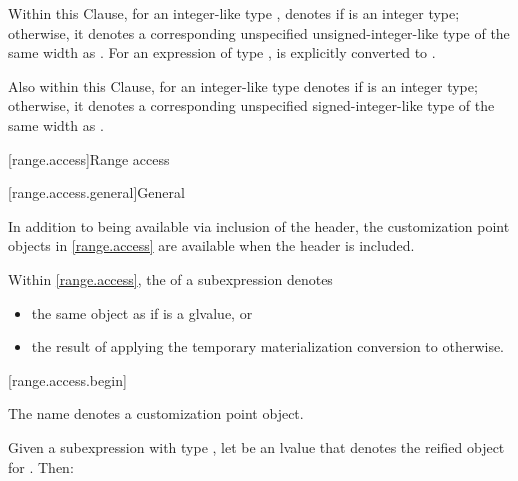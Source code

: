 \pnum
{}%
%
Within this Clause,
for an integer-like type ,
 denotes
 if  is an integer type;
otherwise, it denotes a corresponding unspecified unsigned-integer-like type
of the same width as .
For an expression  of type ,
 is
 explicitly converted to
.

\pnum
Also within this Clause,
 for an integer-like type 
denotes  if  is an integer type;
otherwise, it denotes a corresponding unspecified signed-integer-like type
of the same width as .

[range.access]{Range access}

[range.access.general]{General}

\pnum
In addition to being available via inclusion of the 
header, the customization point objects in \ref{range.access} are
available when the header  is included.

\pnum
Within \ref{range.access},
the  of a subexpression  denotes
\begin{itemize}
\item
the same object as  if  is a glvalue, or
\item
the result of applying
the temporary materialization conversion to  otherwise.
\end{itemize}

[range.access.begin]{}
%

\pnum
The name  denotes a customization point
object.

\pnum
Given a subexpression  with type ,
let  be an lvalue that denotes the reified object for .
Then:

